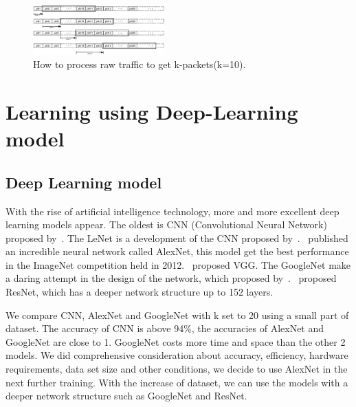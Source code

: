 \documentclass[conference]{IEEEtran}
\begin{document}
\begin{figure}[htp]
\begin{center}
\includegraphics[width=0.45\textwidth]{dataset.eps}
\caption{How to process raw traffic to get k-packets(k=10).}\label{fig:dataset}
\end{center}
\end{figure}

\section{Learning using Deep-Learning model}
\label{sec:learningusingdeeplearningmodel}
\subsection{Deep Learning model}
With the rise of artificial intelligence technology, more and more excellent deep learning models appear. The oldest is CNN (Convolutional Neural Network) proposed by~\cite{6}. The LeNet is a development of the CNN proposed by~\cite{7}.~\cite{8} published an incredible neural network called AlexNet, this model get the best performance in the ImageNet competition held in 2012.~\cite{9} proposed VGG. The GoogleNet make a daring attempt in the design of the network, which proposed by~\cite{10}.~\cite{11} proposed ResNet, which has a deeper network structure up to 152 layers.

We compare CNN, AlexNet and GoogleNet with k set to 20 using a small part of dataset. The accuracy of CNN is above 94\%, the accuracies of AlexNet and GoogleNet are close to 1. GoogleNet costs more time and space than the other 2 models. We did comprehensive consideration about accuracy, efficiency, hardware requirements, data set size and other conditions, we decide to use AlexNet in the next further training. With the increase of dataset, we can use the models with a deeper network structure such as GoogleNet and ResNet.
\end{document}
